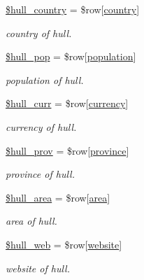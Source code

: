 \begin{DoxyCompactItemize}
\mbox{\hyperlink{index_8php_afba36b1379b54ac2b75e704c548b3f2c}{\$hull\+\_\+country}} = \$row\mbox{[}\textquotesingle{}\mbox{\hyperlink{index_8php_a0f0752705301c982dc8994ebc993e6e9}{country}}\textquotesingle{}\mbox{]}
\begin{DoxyCompactList}\small\item\em country of hull. \end{DoxyCompactList}\item 
\mbox{\hyperlink{index_8php_a009564d1c0613f4835396733f31920c0}{\$hull\+\_\+pop}} = \$row\mbox{[}\textquotesingle{}\mbox{\hyperlink{index_8php_aa78fa356925cd3f67d485c4d6846202b}{population}}\textquotesingle{}\mbox{]}
\begin{DoxyCompactList}\small\item\em population of hull. \end{DoxyCompactList}\item 
\mbox{\hyperlink{index_8php_a0a1e0de1e05cca55159a2ce410ea2ac9}{\$hull\+\_\+curr}} = \$row\mbox{[}\textquotesingle{}\mbox{\hyperlink{index_8php_abd84e0698c321abdbf211d5b8425d0b5}{currency}}\textquotesingle{}\mbox{]}
\begin{DoxyCompactList}\small\item\em currency of hull. \end{DoxyCompactList}\item 
\mbox{\hyperlink{index_8php_a5a22018a71078063c322b9d9c28b248e}{\$hull\+\_\+prov}} = \$row\mbox{[}\textquotesingle{}\mbox{\hyperlink{index_8php_a38d70414c65575df5643ad4296c9db2e}{province}}\textquotesingle{}\mbox{]}
\begin{DoxyCompactList}\small\item\em province of hull. \end{DoxyCompactList}\item 
\mbox{\hyperlink{index_8php_a4acd88460885f0c986cb80568d4635f3}{\$hull\+\_\+area}} = \$row\mbox{[}\textquotesingle{}\mbox{\hyperlink{index_8php_a5198216176428aa2303311f956213f33}{area}}\textquotesingle{}\mbox{]}
\begin{DoxyCompactList}\small\item\em area of hull. \end{DoxyCompactList}\item 
\mbox{\hyperlink{index_8php_a5acbf72a3c5ccb817baae0bbb0daf2c8}{\$hull\+\_\+web}} = \$row\mbox{[}\textquotesingle{}\mbox{\hyperlink{index_8php_a8c56014cff17c1ced653aa98455da680}{website}}\textquotesingle{}\mbox{]}
\begin{DoxyCompactList}\small\item\em website of hull. \end{DoxyCompactList}\item 

\end{DoxyCompactItemize}
